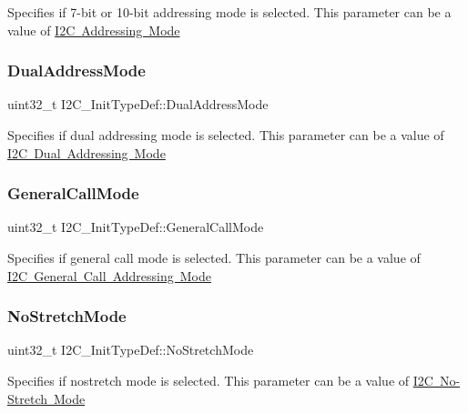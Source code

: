 Specifies if 7-\/bit or 10-\/bit addressing mode is selected. This parameter can be a value of \mbox{\hyperlink{group___i2_c___a_d_d_r_e_s_s_i_n_g___m_o_d_e}{I2C Addressing Mode}} \mbox{\label{struct_i2_c___init_type_def_add6a6b87ee067d33c94c554288736d40}} 
\subsubsection{\texorpdfstring{DualAddressMode}{DualAddressMode}}
{\footnotesize\ttfamily uint32\+\_\+t I2\+C\+\_\+\+Init\+Type\+Def\+::\+Dual\+Address\+Mode}

Specifies if dual addressing mode is selected. This parameter can be a value of \mbox{\hyperlink{group___i2_c___d_u_a_l___a_d_d_r_e_s_s_i_n_g___m_o_d_e}{I2C Dual Addressing Mode}} \mbox{\label{struct_i2_c___init_type_def_a17ce92b135a4b5c045a5387c91677803}} 
\subsubsection{\texorpdfstring{GeneralCallMode}{GeneralCallMode}}
{\footnotesize\ttfamily uint32\+\_\+t I2\+C\+\_\+\+Init\+Type\+Def\+::\+General\+Call\+Mode}

Specifies if general call mode is selected. This parameter can be a value of \mbox{\hyperlink{group___i2_c___g_e_n_e_r_a_l___c_a_l_l___a_d_d_r_e_s_s_i_n_g___m_o_d_e}{I2C General Call Addressing Mode}} \mbox{\label{struct_i2_c___init_type_def_a28afdce458703464638f1a01e04da04e}} 
\subsubsection{\texorpdfstring{NoStretchMode}{NoStretchMode}}
{\footnotesize\ttfamily uint32\+\_\+t I2\+C\+\_\+\+Init\+Type\+Def\+::\+No\+Stretch\+Mode}

Specifies if nostretch mode is selected. This parameter can be a value of \mbox{\hyperlink{group___i2_c___n_o_s_t_r_e_t_c_h___m_o_d_e}{I2C No-\/\+Stretch Mode}} \mbox{\label{struct_i2_c___init_type_def_abfb610317ea08e85c8feece82ccc9e16}} 
